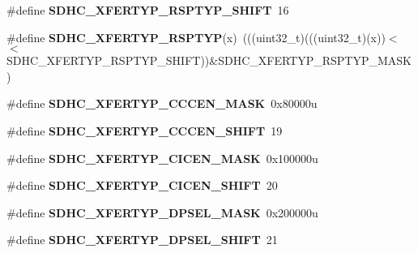 \begin{DoxyCompactItemize}
\item 
\#define {\bfseries S\+D\+H\+C\+\_\+\+X\+F\+E\+R\+T\+Y\+P\+\_\+\+R\+S\+P\+T\+Y\+P\+\_\+\+S\+H\+I\+FT}~16\hypertarget{group__SDHC__Register__Masks_gabcc1b92e4008ae1b4b0ad594d09906c1}{}\label{group__SDHC__Register__Masks_gabcc1b92e4008ae1b4b0ad594d09906c1}

\item 
\#define {\bfseries S\+D\+H\+C\+\_\+\+X\+F\+E\+R\+T\+Y\+P\+\_\+\+R\+S\+P\+T\+YP}(x)~(((uint32\+\_\+t)(((uint32\+\_\+t)(x))$<$$<$S\+D\+H\+C\+\_\+\+X\+F\+E\+R\+T\+Y\+P\+\_\+\+R\+S\+P\+T\+Y\+P\+\_\+\+S\+H\+I\+FT))\&S\+D\+H\+C\+\_\+\+X\+F\+E\+R\+T\+Y\+P\+\_\+\+R\+S\+P\+T\+Y\+P\+\_\+\+M\+A\+SK)\hypertarget{group__SDHC__Register__Masks_gaf2c43c5373367a04ff30a95428d1c0f5}{}\label{group__SDHC__Register__Masks_gaf2c43c5373367a04ff30a95428d1c0f5}

\item 
\#define {\bfseries S\+D\+H\+C\+\_\+\+X\+F\+E\+R\+T\+Y\+P\+\_\+\+C\+C\+C\+E\+N\+\_\+\+M\+A\+SK}~0x80000u\hypertarget{group__SDHC__Register__Masks_ga685761802ba9bd3a16540f0b4cf1815d}{}\label{group__SDHC__Register__Masks_ga685761802ba9bd3a16540f0b4cf1815d}

\item 
\#define {\bfseries S\+D\+H\+C\+\_\+\+X\+F\+E\+R\+T\+Y\+P\+\_\+\+C\+C\+C\+E\+N\+\_\+\+S\+H\+I\+FT}~19\hypertarget{group__SDHC__Register__Masks_ga8d90ea7df50316ee6c8902df84662c4c}{}\label{group__SDHC__Register__Masks_ga8d90ea7df50316ee6c8902df84662c4c}

\item 
\#define {\bfseries S\+D\+H\+C\+\_\+\+X\+F\+E\+R\+T\+Y\+P\+\_\+\+C\+I\+C\+E\+N\+\_\+\+M\+A\+SK}~0x100000u\hypertarget{group__SDHC__Register__Masks_ga6ab41eef488a5bd6074f0ce44d67fe92}{}\label{group__SDHC__Register__Masks_ga6ab41eef488a5bd6074f0ce44d67fe92}

\item 
\#define {\bfseries S\+D\+H\+C\+\_\+\+X\+F\+E\+R\+T\+Y\+P\+\_\+\+C\+I\+C\+E\+N\+\_\+\+S\+H\+I\+FT}~20\hypertarget{group__SDHC__Register__Masks_ga23f6e1c33faf0b718dfaaef43b678084}{}\label{group__SDHC__Register__Masks_ga23f6e1c33faf0b718dfaaef43b678084}

\item 
\#define {\bfseries S\+D\+H\+C\+\_\+\+X\+F\+E\+R\+T\+Y\+P\+\_\+\+D\+P\+S\+E\+L\+\_\+\+M\+A\+SK}~0x200000u\hypertarget{group__SDHC__Register__Masks_ga3230581622fc9670367e7deaf2c3a95f}{}\label{group__SDHC__Register__Masks_ga3230581622fc9670367e7deaf2c3a95f}

\item 
\#define {\bfseries S\+D\+H\+C\+\_\+\+X\+F\+E\+R\+T\+Y\+P\+\_\+\+D\+P\+S\+E\+L\+\_\+\+S\+H\+I\+FT}~21\hypertarget{group__SDHC__Register__Masks_ga4de27d59ffd9269e2d4e9b61fa61eb5a}{}\label{group__SDHC__Register__Masks_ga4de27d59ffd9269e2d4e9b61fa61eb5a}


\end{DoxyCompactItemize}
